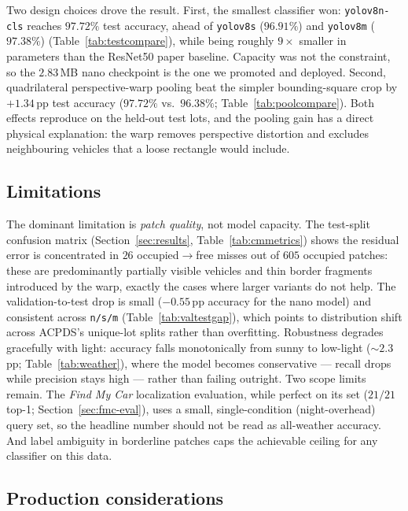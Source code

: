 \documentclass[10pt,twocolumn,letterpaper]{article}
\begin{document}
Two design choices drove the result. First, the smallest classifier won:
\texttt{yolov8n-cls} reaches $97.72\%$ test accuracy, ahead of
\texttt{yolov8s} ($96.91\%$) and \texttt{yolov8m} ($97.38\%$)
(Table~\ref{tab:testcompare}), while being roughly $9\times$ smaller in
parameters than the ResNet50 paper baseline. Capacity was not the
constraint, so the $2.83$\,MB nano checkpoint is the one we promoted and
deployed. Second, quadrilateral perspective-warp pooling beat the simpler
bounding-square crop by $+1.34$\,pp test accuracy ($97.72\%$ vs.\ $96.38\%$;
Table~\ref{tab:poolcompare}). Both effects reproduce on the held-out test
lots, and the pooling gain has a direct physical explanation: the warp
removes perspective distortion and excludes neighbouring vehicles that a
loose rectangle would include.

\subsection{Limitations}

The dominant limitation is \emph{patch quality}, not model capacity. The
test-split confusion matrix (Section~\ref{sec:results}, Table~\ref{tab:cmmetrics})
shows the residual error is concentrated in $26$ occupied$\rightarrow$free
misses out of $605$ occupied patches: these are predominantly partially
visible vehicles and thin border fragments introduced by the warp, exactly
the cases where larger variants do not help. The validation-to-test drop is
small ($-0.55$\,pp accuracy for the nano model) and consistent across
\texttt{n/s/m} (Table~\ref{tab:valtestgap}), which points to distribution
shift across ACPDS's unique-lot splits rather than overfitting. Robustness
degrades gracefully with light: accuracy falls monotonically from sunny to
low-light ($\sim$$2.3$\,pp; Table~\ref{tab:weather}), where the model
becomes conservative --- recall drops while precision stays high --- rather
than failing outright. Two scope limits remain. The \emph{Find My Car}
localization evaluation, while perfect on its set ($21/21$ top-1;
Section~\ref{sec:fmc-eval}), uses a small, single-condition (night-overhead)
query set, so the headline number should not be read as all-weather
accuracy. And label ambiguity in borderline patches caps the achievable
ceiling for any classifier on this data.

\subsection{Production considerations}
\end{document}
